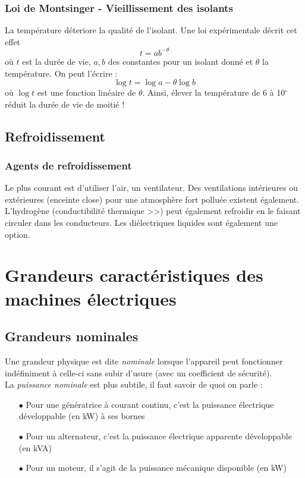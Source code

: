 		\subsubsection{Loi de Montsinger - Vieillissement des isolants}
		La température déteriore la qualité de l'isolant. Une loi expérimentale 
		décrit cet effet
		\begin{equation}
		t = ab^{-\theta}
		\end{equation}
		où $t$ est la durée de vie, $a,b$ des constantes pour un isolant donné 
		et $\theta$ la température. On peut l'écrire :
		\begin{equation}
		\log t = \log a - \theta\log b
		\end{equation}
		où $\log t$ est une fonction linéaire de $\theta$. Ainsi, élever la 
		température de 6 à 10$^\circ$ réduit la durée de vie de moitié !
		
	\subsection{Refroidissement}
		\subsubsection{Agents de refroidissement}
		Le plus courant est d'utiliser l'air, un ventilateur. Des ventilations 
		intérieures ou extérieures (enceinte close) pour une atmosphère fort 
		polluée existent également. L'hydrogène (conductibilité thermique >>) peut également refroidir en 
		le faisant circuler dans les conducteurs. Les diélectriques liquides 
		sont également une option.
		
\section{Grandeurs caractéristiques des machines électriques}
	\subsection{Grandeurs nominales}
	Une grandeur physique est dite \textit{nominale} lorsque l'appareil peut 
	fonctionner indéfiniment à celle-ci sans subir d'usure (avec un coefficient 
	de sécurité).\\
	La \textit{puissance nominale} est plus subtile, il faut savoir de quoi on 
	parle :
	\begin{itemize}
	\item[$\bullet$] Pour une génératrice à courant continu, c'est la puissance électrique développable (en kW) à ses 
	bornes
	\item[$\bullet$] Pour un alternateur, c'est la puissance électrique 
	apparente développable (en kVA)
	\item[$\bullet$] Pour un moteur, il s'agit de la puissance mécanique 
	disponible (en kW)
	\end{itemize}
	
